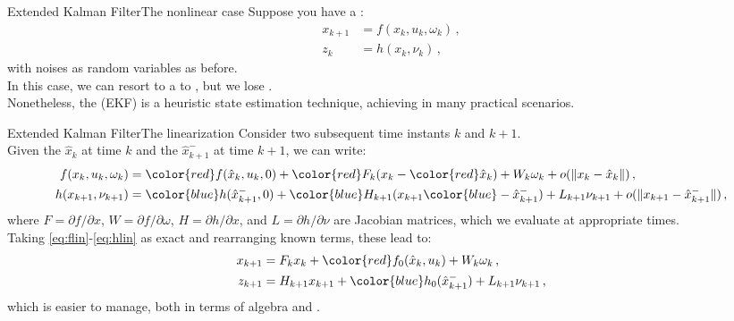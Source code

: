 \begin{frame}{Extended Kalman Filter}{The nonlinear case}
  Suppose you have a :
  \begin{subequations}
    \begin{align}
      x_{k+1} &= f(x_k,u_k,\omega_k)\,,\\
      z_k &= h(x_k,\nu_k)\,,
    \end{align}
  \end{subequations}
  with noises as random variables as before.\\
  In this case, we can resort to a  to , but we lose .\\
  Nonetheless, the  (EKF) is a  heuristic state estimation technique, achieving  in many practical scenarios.
\end{frame}
\begin{frame}{Extended Kalman Filter}{The linearization}
  Consider two subsequent time instants $k$ and $k+1$.\\
  Given the  $\hat{x}_k$ at time $k$ and the  $\hat{x}_{k+1}^{-}$ at time $k+1$, we can write:
  \begin{subequations}
    \begin{align}
      f(x_k,u_k,\omega_k) &= {\color{red}f(\hat{x}_k,u_k,0)} + {\color{red}F_k}(x_k - {\color{red}\hat{x}_k}) + W_k\omega_k + o(\|x_k - \hat{x}_k\|)\,,\label{eq:flin}\\
      h(x_{k+1},\nu_{k+1}) &= {\color{blue}h(\hat{x}_{k+1}^{-},0)} + {\color{blue}H_{k+1}}(x_{k+1} {\color{blue}- \hat{x}_{k+1}^{-}}) + L_{k+1}\nu_{k+1} + o(\|x_{k+1} - \hat{x}_{k+1}^{-}\|)\,,\label{eq:hlin}
    \end{align}
  \end{subequations}
  where $F=\partial f/\partial x$, $W=\partial f/\partial \omega$, $H=\partial h/\partial x$, and $L=\partial h/\partial \nu$ are Jacobian matrices, which we evaluate at appropriate times.\\
  Taking \eqref{eq:flin}-\eqref{eq:hlin} as exact and rearranging known terms, these lead to:
  \begin{subequations}
    \begin{align}
      x_{k+1} &= F_k x_k + {\color{red}f_0(\hat{x}_k,u_k)} + W_k\omega_k\,,\\
      z_{k+1} &= H_{k+1}x_{k+1} + {\color{blue}h_0(\hat{x}_{k+1}^{-})} + L_{k+1}\nu_{k+1}\,,\label{eq:newmeas}
    \end{align}
  \end{subequations}
  which is easier to manage, both in terms of algebra and .
\end{frame}
